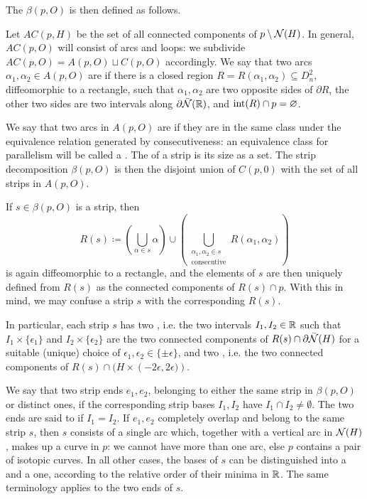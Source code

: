 The  $\beta(p,O)$ is then defined as follows.

Let $AC(p, H)$ be the set of all connected components of $p\setminus{\mathcal N}(H)$. In general, $AC(p,O)$ will consist of arcs and loops: we subdivide $AC(p,O)=A(p,O)\sqcup C(p,O)$ accordingly. We say that two arcs $\alpha_1,\alpha_2\in A(p,O)$ are  if there is a closed region $R=R(\alpha_1,\alpha_2)\subseteq D^2_n$, diffeomorphic to a rectangle, such that $\alpha_1,\alpha_2$ are two opposite sides of $\partial R$, the other two sides are two intervals along $\partial\bar{{\mathcal N}}(\mathbb R)$, and $\mathrm{int}(R)\cap p=\varnothing$.

We say that two arcs in $A(p,O)$ are  if they are in the same class under the equivalence relation generated by consecutiveness: an equivalence class for parallelism will be called a . The  of a strip is its size as a set. The strip decomposition $\beta(p,O)$ is then the disjoint union of $C(p,0)$ with the set of all strips in $A(p,O)$.

If $s\in \beta(p,O)$ is a strip, then 
$$
R(s)\coloneqq \left(\bigcup_{\alpha\in s}\alpha\right)\cup \left(\bigcup_{\substack{\alpha_1,\alpha_2\in s\\\text{consecutive}}}R(\alpha_1,\alpha_2)\right)
$$
is again diffeomorphic to a rectangle, and the elements of $s$ are then uniquely defined from $R(s)$ as the connected components of $R(s)\cap p$. With this in mind, we may confuse a strip $s$ with the corresponding $R(s)$.

In particular, each strip $s$ has two , i.e. the two intervals $I_1,I_2\in \mathbb R$ such that $I_1\times\{\epsilon_1\}$ and $I_2\times\{\epsilon_2\}$ are the two connected components of $R(s)\cap \partial\bar{{\mathcal N}}(H)$ for a suitable (unique) choice of $\epsilon_1,\epsilon_2\in\{\pm\epsilon\}$, and two , i.e. the two connected components of $R(s)\cap (H\times\left(-2\epsilon,2\epsilon)\right)$. 

We say that two strip ends $e_1,e_2$, belonging to either the same strip in $\beta(p,O)$ or distinct ones,  if the corresponding strip bases $I_1,I_2$ have $I_1\cap I_2\not=\emptyset$. The two ends are said to  if $I_1=I_2$. If $e_1,e_2$ completely overlap and belong to the same strip $s$, then $s$ consists of a single arc which, together with a vertical arc in ${\mathcal N}(H)$, makes up a curve in $p$: we cannot have more than one arc, else $p$ contains a pair of isotopic curves. In all other cases, the bases of $s$ can be distinguished into a  and a  one, according to the relative order of their minima in $\mathbb R$. The same terminology applies to the two ends of $s$.

